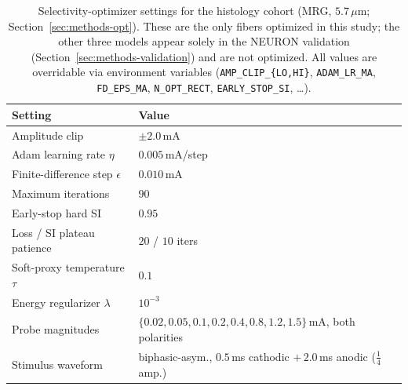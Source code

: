 \begin{table}[h]
  \centering
  \caption{Selectivity-optimizer settings for the histology cohort
    (MRG, $5.7\,\mu$m; Section~\ref{sec:methods-opt}).  These are the
    only fibers optimized in this study; the other three models appear
    solely in the NEURON validation
    (Section~\ref{sec:methods-validation}) and are not optimized.  All
    values are overridable via environment variables
    (\texttt{AMP\_CLIP\_\{LO,HI\}}, \texttt{ADAM\_LR\_MA},
    \texttt{FD\_EPS\_MA}, \texttt{N\_OPT\_RECT}, \texttt{EARLY\_STOP\_SI},
    \dots).}
  \label{tab:opt-hparams}
  \small
  \begin{tabular}{ll}
    \toprule
    Setting & Value \\
    \midrule
    Amplitude clip                      & $\pm 2.0$\,mA \\
    Adam learning rate $\eta$           & $0.005$\,mA/step \\
    Finite-difference step $\epsilon$   & $0.010$\,mA \\
    Maximum iterations                  & $90$ \\
    Early-stop hard SI                  & $0.95$ \\
    Loss / SI plateau patience          & $20$ / $10$ iters \\
    Soft-proxy temperature $\tau$       & $0.1$ \\
    Energy regularizer $\lambda$        & $10^{-3}$ \\
    Probe magnitudes                    & $\{0.02, 0.05, 0.1, 0.2, 0.4, 0.8, 1.2, 1.5\}$\,mA, both polarities \\
    Stimulus waveform                   & biphasic-asym., $0.5\,$ms cathodic $+\,2.0\,$ms anodic ($\tfrac14$ amp.) \\
    \bottomrule
  \end{tabular}
\end{table}

